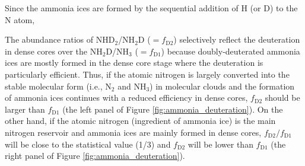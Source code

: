 \documentclass[12pt,a4paper]{article}  %
\begin{document}
Since the ammonia ices are formed by the sequential addition of H (or D) to the N atom, 


The abundance ratios of NHD$_2$/NH$_2$D ($=f_\mathrm{D2}$) selectively reflect the deuteration in dense cores over the NH$_2$D/NH$_3$ ($=f_\mathrm{D1}$) because doubly-deuterated ammonia ices are mostly formed in the dense core stage where the deuteration is particularly efficient. 
Thus, if the atomic nitrogen is largely converted into the stable molecular form (i.e., N$_2$ and NH$_3$) in molecular clouds and the formation of ammonia ices continues with a reduced efficiency in dense cores, $f_\mathrm{D2}$ should be larger than $f_\mathrm{D1}$ (the left panel of Figure \ref{fig:ammonia_deuteration}). On the other hand, if the atomic nitrogen (ingredient of ammonia ice) is the main nitrogen reservoir and ammonia ices are mainly formed in dense cores, $f_\mathrm{D2}/f_\mathrm{D1}$ will be close to the statistical value (1/3) and $f_\mathrm{D2}$ will be lower than $f_\mathrm{D1}$ (the right panel of Figure \ref{fig:ammonia_deuteration}).
\end{document}
